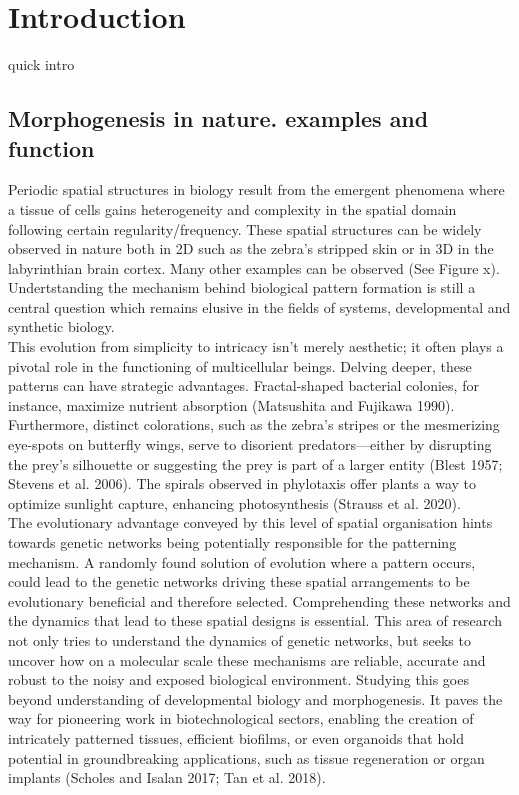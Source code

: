 
\chapter{Introduction}
quick intro
\section{Morphogenesis in nature. examples and function}
Periodic spatial structures in biology result from the emergent phenomena where a tissue of cells gains heterogeneity and complexity in the spatial domain following certain regularity/frequency.
These spatial structures can be widely observed in nature both in 2D such as the zebra's stripped skin or in 3D in the labyrinthian brain cortex.
Many other examples can be observed (See Figure x).
Undertstanding the mechanism behind biological pattern formation is still a central question which remains elusive in the fields of systems, developmental and synthetic biology.\\

This evolution from simplicity to intricacy isn't merely aesthetic; it often plays a pivotal role in the functioning of multicellular beings.
Delving deeper, these patterns can have strategic advantages. Fractal-shaped bacterial colonies, for instance, maximize nutrient absorption (Matsushita and Fujikawa 1990).
Furthermore, distinct colorations, such as the zebra's stripes or the mesmerizing eye-spots on butterfly wings, serve to disorient predators—either by disrupting the prey's silhouette or suggesting the prey is part of a larger entity (Blest 1957; Stevens et al. 2006).
The spirals observed in phylotaxis offer plants a way to optimize sunlight capture, enhancing photosynthesis (Strauss et al. 2020).\\

The evolutionary advantage conveyed by this level of spatial organisation  hints towards genetic networks being potentially responsible for the patterning mechanism.
A randomly found solution of evolution where a pattern occurs, could lead to the genetic networks driving these spatial arrangements to be evolutionary beneficial and therefore selected.
Comprehending these networks and the dynamics that lead to these spatial designs is essential.
This area of research not only tries to understand the dynamics of genetic networks, but seeks to uncover how on a molecular scale these mechanisms are reliable, accurate and robust to the noisy and exposed biological environment.
Studying this goes beyond understanding of developmental biology and morphogenesis.
It paves the way for pioneering work in biotechnological sectors, enabling the creation of intricately patterned tissues, efficient biofilms, or even organoids that hold potential in groundbreaking applications, such as tissue regeneration or organ implants (Scholes and Isalan 2017; Tan et al. 2018).\\



